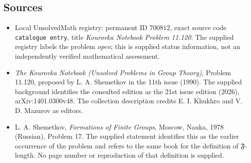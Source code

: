 \documentclass[11pt]{article}
\begin{document}
\subsection{Sources}
\begin{itemize}
\item Local UnsolvedMath registry: permanent ID \(700812\), exact source code \texttt{catalogue entry}, title \emph{Kourovka Notebook Problem 11.120}. The supplied registry labels the problem \emph{open}; this is supplied status information, not an independently verified mathematical assessment.
\item \emph{The Kourovka Notebook (Unsolved Problems in Group Theory)}, Problem 11.120, proposed by L. A. Shemetkov in the 11th issue (1990). The supplied background identifies the consulted edition as the 21st issue edition (2026), arXiv:1401.0300v48. The collection description credits E. I. Khukhro and V. D. Mazurov as editors.
\item L. A. Shemetkov, \emph{Formations of Finite Groups}, Moscow, Nauka, 1978 (Russian), Problem 17. The supplied statement identifies this as the earlier occurrence of the problem and refers to the same book for the definition of \(\mathfrak F\)-length. No page number or reproduction of that definition is supplied.
\end{itemize}
\end{document}
